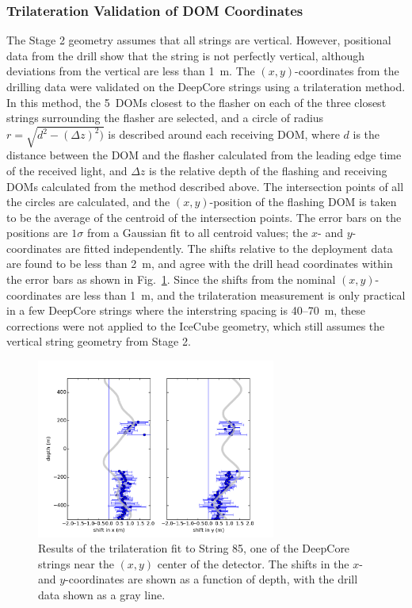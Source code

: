 \subsubsection{\label{sec:trilateration}Trilateration Validation of DOM Coordinates}

The Stage 2 geometry assumes that all strings are vertical. However,
positional data from the drill show that the string is not perfectly vertical,
although deviations from the vertical are less than 1~m. The
$(x,y)$-coordinates from the drilling data were validated on the DeepCore strings
using a trilateration method. In this method, the 5~DOMs closest to the
flasher on each of the three closest strings surrounding the flasher are
selected, and a circle of radius $r = \sqrt{d^2 - (\Delta z)^2)}$ is
described around each receiving DOM, where $d$ is the distance between the DOM
and the flasher calculated from the leading edge time of the received
light, and $\Delta z$ is the relative depth of the flashing and receiving
DOMs calculated from the method described above. The intersection points of
all the circles are calculated, and the $(x,y)$-position of the flashing DOM
is taken to be the average of the centroid of the intersection points. The
error bars on the positions are $1 \sigma$ from a Gaussian fit to all
centroid values; the $x$- and $y$-coordinates are fitted independently. The
shifts relative to the deployment data are found to be less than 2~m, and
agree with the drill head coordinates within the error bars as shown in
Fig.~\ref{fig:trilateration}. Since the shifts from the nominal
$(x,y)$-coordinates are less than 1~m, and the trilateration measurement is only
practical in a few DeepCore strings where the interstring spacing is 40--70~m, these
corrections were not applied to the IceCube geometry, which still assumes
the vertical string geometry from Stage 2.

\begin{figure}[!ht]
 \centering
 \includegraphics[width=0.7\textwidth]{graphics/geometry/newtrilat85.pdf}
\caption{Results of the trilateration fit to String 85, one of the DeepCore
  strings near the $(x,y)$ center of the detector. The shifts in the
  $x$- and $y$-coordinates are shown as a function of depth, with the drill data
  shown as a gray line.}
\label{fig:trilateration}
\end{figure}

